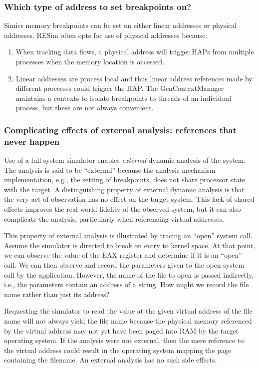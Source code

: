\documentclass[titlepage]{article}
\begin{document}
\begin{appendices}
\subsubsection{Which type of address to set breakpoints on?}
Simics memory breakpoints can be set on either linear addresses or physical addresses.
RESim often opts for use of physical addresses because:
\begin{enumerate}
\item When tracking data flows, a physical address will trigger HAPs from multiple processes when the memory location is accessed.
\item Linear addresses are process local and thus linear address references made by different processes could trigger the HAP.
The GenContextManager maintains a contexts to isolate breakpoints to threads of an individual process, but these are not always
convenient.
\end{enumerate}

\subsubsection{Complicating effects of external analysis: references that never happen}
\label{external}
Use of a full system simulator enables \textit{external} dynamic analysis of the system.  The analysis is said to be
“external” because the analysis mechanism implementation, e.g., the setting of breakpoints,  does not 
share processor state with the target.
A distinguishing property of external dynamic analysis is that the very act of observation has no effect on the target
system.  This lack of shared effects improves the real-world fidelity of the observed system, but it can also complicate the
analysis, particularly when referencing virtual addresses. 

This property of external analysis is illustrated by tracing an “open” system call. 
Assume the simulator is directed to break on entry to kernel space.  At that point, we can observe the value
of the EAX register and determine if it is an “open” call.  We can then observe and record the
parameters given to the open system call by the application.  However, the name of the file to open
is passed indirectly, i.e., the parameters contain an address of a string.  How might we record
the file name rather than just its address?   

Requesting the simulator to read the value at the given virtual address of the
file name will not always yield the file name because the
physical memory referenced by the virtual address may not yet have been paged into RAM by the target operating system.
If the analysis were not external, then the mere reference to the virtual address could result in the
operating system mapping the page containing the filename.  An external analysis has no such side effects.


\end{appendices}
\end{document}
